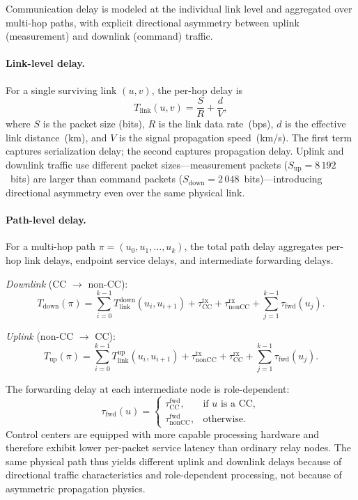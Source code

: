 \documentclass[a4paper,fleqn]{cas-dc}
\newcommand{\tauCC}{\tau_{\text{CC}}}
\newcommand{\tauNCC}{\tau_{\text{nonCC}}}
\begin{document}
Communication delay is modeled at the individual link level and
aggregated over multi-hop paths, with explicit directional asymmetry
between uplink (measurement) and downlink (command) traffic.

\paragraph{Link-level delay.}
For a single surviving link $(u,v)$, the per-hop delay is
\begin{equation}\label{eq:link_delay}
  T_{\text{link}}(u,v) = \frac{S}{R} + \frac{d}{V},
\end{equation}
where $S$ is the packet size (bits), $R$ is the link data rate~(bps),
$d$ is the effective link distance~(km), and $V$ is the signal
propagation speed~(km/s).  The first term captures serialization delay;
the second captures propagation delay.  Uplink and downlink traffic use
different packet sizes---measurement packets ($S_{\text{up}}=8\,192$~bits)
are larger than command packets ($S_{\text{down}}=2\,048$~bits)---introducing
directional asymmetry even over the same physical link.

\paragraph{Path-level delay.}
For a multi-hop path $\pi=(u_0,u_1,\dots,u_k)$, the total path delay
aggregates per-hop link delays, endpoint service delays, and
intermediate forwarding delays.

\textit{Downlink} (CC $\to$ non-CC):
\begin{equation}\label{eq:Tdown}
  T_{\text{down}}(\pi) = \sum_{i=0}^{k-1}T_{\text{link}}^{\text{down}}(u_i,u_{i+1})
  + \tauCC^{\text{tx}} + \tauNCC^{\text{rx}}
  + \sum_{j=1}^{k-1}\tau_{\text{fwd}}(u_j).
\end{equation}

\textit{Uplink} (non-CC $\to$ CC):
\begin{equation}\label{eq:Tup}
  T_{\text{up}}(\pi) = \sum_{i=0}^{k-1}T_{\text{link}}^{\text{up}}(u_i,u_{i+1})
  + \tauNCC^{\text{tx}} + \tauCC^{\text{rx}}
  + \sum_{j=1}^{k-1}\tau_{\text{fwd}}(u_j).
\end{equation}

The forwarding delay at each intermediate node is role-dependent:
\begin{equation}\label{eq:fwd}
  \tau_{\text{fwd}}(u) =
  \begin{cases}
    \tauCC^{\text{fwd}},   & \text{if } u \text{ is a CC},\\
    \tauNCC^{\text{fwd}},  & \text{otherwise}.
  \end{cases}
\end{equation}
Control centers are equipped with more capable processing hardware and
therefore exhibit lower per-packet service latency than ordinary relay
nodes.  The same physical path thus yields different uplink and downlink
delays because of directional traffic characteristics and role-dependent
processing, not because of asymmetric propagation physics.
\end{document}
